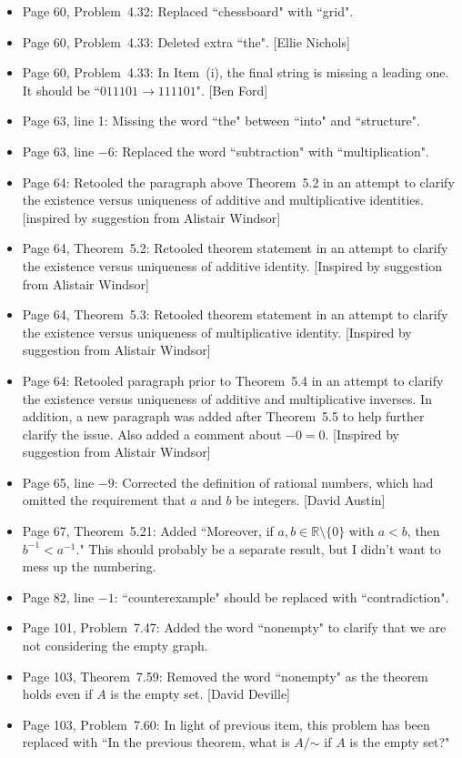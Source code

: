 \documentclass[11pt]{article}%
\begin{document}
\begin{itemize}
\item Page 60, Problem~4.32: Replaced ``chessboard" with ``grid".
\item Page 60, Problem~4.33: Deleted extra ``the". [Ellie Nichols]
\item Page 60, Problem~4.33: In Item~(i), the final string is missing a leading one.  It should be ``$011101 \to 111101$". [Ben Ford]
\item Page 63, line 1: Missing the word ``the" between ``into" and ``structure".
\item Page 63, line $-6$: Replaced the word ``subtraction" with ``multiplication". 
\item Page 64: Retooled the paragraph above Theorem~5.2 in an attempt to clarify the existence versus uniqueness of additive and multiplicative identities. [inspired by suggestion from Alistair Windsor]
\item Page 64, Theorem~5.2: Retooled theorem statement in an attempt to clarify the existence versus uniqueness of additive identity. [Inspired by suggestion from Alistair Windsor]
\item Page 64, Theorem~5.3: Retooled theorem statement in an attempt to clarify the existence versus uniqueness of multiplicative identity. [Inspired by suggestion from Alistair Windsor]
\item Page 64: Retooled paragraph prior to Theorem~5.4 in an attempt to clarify the existence versus uniqueness of additive and multiplicative inverses. In addition, a new paragraph was added after Theorem~5.5 to help further clarify the issue. Also added a comment about $-0=0$. [Inspired by suggestion from Alistair Windsor]
\item Page 65, line $-9$: Corrected the definition of rational numbers, which had omitted the requirement that $a$ and $b$ be integers. [David Austin]
\item Page 67, Theorem~5.21: Added ``Moreover, if $a,b\in \mathbb{R}\setminus\{0\}$ with $a<b$, then $b^{-1}<a^{-1}$." This should probably be a separate result, but I didn't want to mess up the numbering.
\item Page 82, line $-1$: ``counterexample" should be replaced with ``contradiction". 
\item Page 101, Problem~7.47: Added the word ``nonempty" to clarify that we are not considering the empty graph.
\item Page 103, Theorem~7.59: Removed the word ``nonempty" as the theorem holds even if $A$ is the empty set. [David Deville]
\item Page 103, Problem~7.60: In light of previous item, this problem has been replaced  with ``In the previous theorem, what is $A/\mathord\sim$ if $A$ is the empty set?"

\end{itemize}
\end{document}
